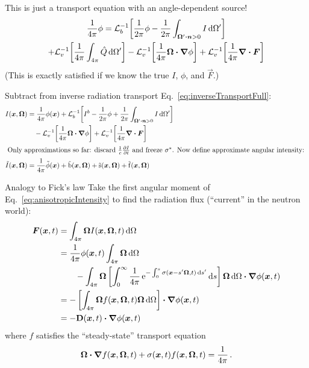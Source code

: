 \documentclass[draft]{beamer}
\begin{document}
\begin{frame}
This is just a transport equation with an angle-dependent source!
\begin{multline} \label{eq:inverseTransportIsotropic}
  \frac1{4\pi} \phi =  \mathcal{L}_{b}^{-1}\!\left[ \frac{1}{2\pi} \phi
 - \frac{1}{2\pi} \int_{\bm{\Omega}' \bm{\cdot} \bm{n} > 0} I \mathop{}\!\mathrm{d}
 \Omega' \right]
 \\
 + \mathcal{L}_{v}^{-1}\!\left[ \frac1{4\pi} \int_{4\pi} \hat Q \mathop{}\!\mathrm{d} \Omega' \right]
 - \mathcal{L}_{v}^{-1}\!\left[ \frac1{4\pi}\bm{\Omega}\bm{\cdot} \bm{\nabla} \phi \right]
 + \mathcal{L}_{v}^{-1}\!\left[ \frac1{4\pi}\bm{\nabla} \bm{\cdot} \bm{F} \right]
\end{multline}
(This is exactly satisfied if we know the true $I$, $\phi$, and $\vec{F}$.)

Subtract from inverse radiation transport Eq.~\eqref{eq:inverseTransportFull}:
\begin{align} \label{eq:inverseAnisotropicExact}
  I(\bm{x}, \bm{\Omega})
  &= \frac1{4\pi} \phi(\bm{x}) 
  + \mathcal{L}_{b}^{-1}\!\left[I^b - \frac{1}{2\pi} \phi
  + \frac{1}{2\pi} \int_{\bm{\Omega}' \bm{\cdot} \bm{n} > 0}
  I\mathop{}\!\mathrm{d}\Omega'\right]
 \\
 &\quad
 - \mathcal{L}_{v}^{-1}\!\left[ \frac1{4\pi}\bm{\Omega}\bm{\cdot} \bm{\nabla} \phi \right]
 + \mathcal{L}_{v}^{-1}\!\left[ \frac1{4\pi}\bm{\nabla} \bm{\cdot} \bm{F} \right]
 \\ 
 \intertext{ Only approximations so far: discard $\frac{1}{c}\frac{\partial I}{\partial t}$ and
 freeze $\sigma^\ast$. Now define approximate angular intensity:
}
  \nonumber
  \tilde I(\bm{x}, \bm{\Omega})
  &= \frac1{4\pi} \tilde \phi(\bm{x}) 
  + \mathrm{ \tilde b }(\bm{x}, \bm{\Omega})
  + \mathrm{ \tilde s }(\bm{x}, \bm{\Omega})
  + \mathrm{ \tilde f }(\bm{x}, \bm{\Omega})
\end{align}
\end{frame}

\begin{frame}{Analogy to Fick's law}
  Take the first angular moment of Eq.~\eqref{eq:anisotropicIntensity} to find
  the radiation flux (``current'' in the neutron world):
\begin{align*}
  \bm{F}(\bm{x}, t) &= \int_{4\pi} \bm{\Omega} I(\bm{x}, \bm{\Omega}, t) \mathop{}\!\mathrm{d} \Omega
  \\
  &=
  \frac{1}{4\pi}\phi(\bm{x}, t) \int_{4\pi} \bm{\Omega} \mathop{}\!\mathrm{d} \Omega
  \\
  &\qquad-  \int_{4\pi} \bm{\Omega} \left[ \int_{0}^{\infty} \frac{1}{4\pi}
  \mathop{}\!\mathrm{e}^{- \int_{0}^{s} \sigma(\bm{x}-s'\bm{\Omega}, t)
  \mathop{}\!\mathrm{d} s'} \mathop{}\!\mathrm{d} s\right]
\bm{\Omega}  \mathop{}\!\mathrm{d} \Omega \bm{\cdot} \bm{\nabla} \phi(\bm{x}, t)
\\
&= - \left[ \int_{4\pi} \bm{\Omega} f(\bm{x},\bm{\Omega},t)
\bm{\Omega}  \mathop{}\!\mathrm{d} \Omega \right] \bm{\cdot} \bm{\nabla} \phi(\bm{x}, t)
\\
&= - \mathbf{D}(\bm{x},t) \bm{\cdot} \bm{\nabla} \phi(\bm{x}, t)
\end{align*}
where $f$ satisfies the ``steady-state'' transport equation
\begin{equation} \label{eq:dcoeffTransportEquation}
  \bm{\Omega}\bm{\cdot} \bm{\nabla} f(\bm{x},\bm{\Omega},t) + \sigma(\bm{x},t) f(\bm{x},\bm{\Omega},t) =
  \frac{1}{4\pi}\,.
\end{equation}
\end{frame}
\end{document}
